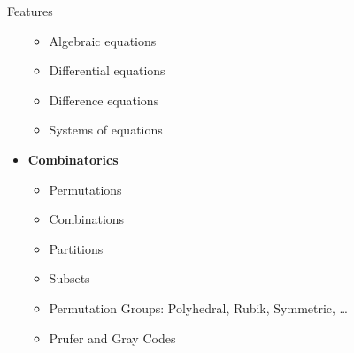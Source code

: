 \documentclass[xcolor=svgnames]{beamer}
\begin{document}
\begin{frame}{Features}
\begin{multicols}{2}
\begin{itemize}
\begin{itemize}
      \item Algebraic equations
      \item Differential equations
      \item Difference equations
      \item Systems of equations
      \end{itemize}
    \item \textbf{Combinatorics}
      \begin{itemize}
        \tiny
      \item Permutations
      \item Combinations
      \item Partitions
      \item Subsets
      \item Permutation Groups: Polyhedral, Rubik, Symmetric, \ldots
      \item Prufer and Gray Codes
      \end{itemize}

    \end{itemize}
  \end{multicols}
\end{frame}
\end{document}
